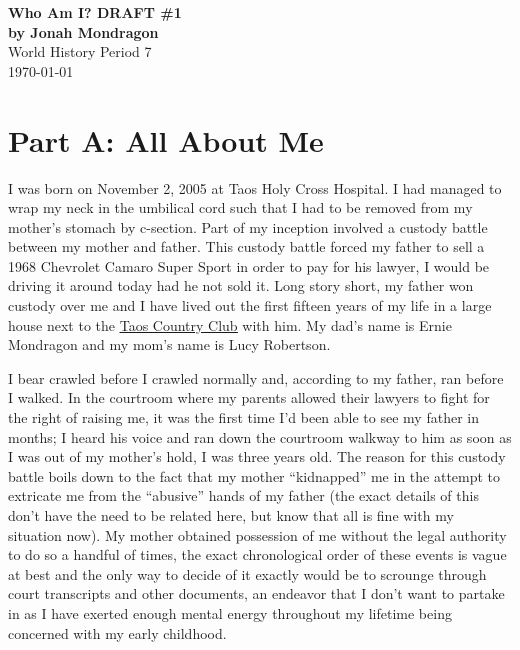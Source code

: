 \documentclass[12pt]{article}
\begin{document}
\doublespacing

\begin{titlepage}
    \begin{center}
        \vspace*{1.5in}
        {\huge\bfseries{Who Am I? DRAFT \#1}}\\
            {\bfseries{by Jonah Mondragon}}\\
            World History Period 7\\
            \today
    \end{center}
\end{titlepage}

\section*{Part A: All About Me}


I was born on November 2, 2005 at Taos Holy Cross Hospital.
I had managed to wrap my neck in the umbilical cord such that I had to be 
removed from my mother's stomach by c-section.
Part of my inception involved a custody battle between my mother and father.
This custody battle forced my father to sell a 1968 Chevrolet Camaro Super Sport
in order to pay for his lawyer, I would be driving it around today had he 
not sold it.
Long story short, my father won custody over me and I have lived out the first
fifteen years of my life in a large house next to the {\color{blue}
\underline{\href{https://www.taoscountryclub.com/}{Taos Country Club}}}
with him. My dad's name is Ernie Mondragon and my mom's name is Lucy Robertson.

I bear crawled before I crawled normally and, according to my father, ran before
I walked.
In the courtroom where my parents allowed their lawyers to fight for the right
of raising me, it was the first time I'd been able to see my father in 
months; %
I heard his voice and ran down the courtroom walkway to him as soon as I was
out of my mother's hold, I was three years old. %
The reason for this custody battle boils down to the fact that my mother
``kidnapped'' me in the attempt to extricate me from the ``abusive'' hands
of my father (the exact details of this don't have the need to be related 
here, but know that all is fine with my situation now).
My mother obtained possession of me without the legal authority to do so a
handful of times, the exact chronological order of these events is vague at
best and the only way to decide of it exactly would be to scrounge through
court transcripts and other documents, an endeavor that I don't want to
partake in as I have exerted enough mental energy throughout my lifetime
being concerned with my early childhood.
\end{document}
